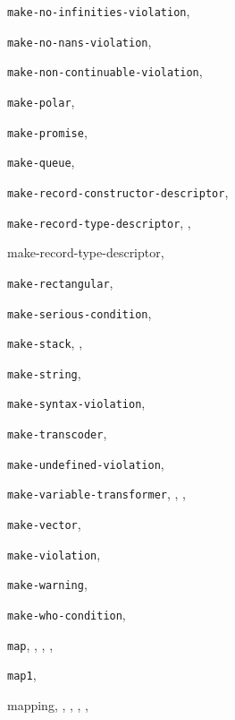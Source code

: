 {\begin{multicols}{2}
\texttt{make-no-infinities-violation}, \textit{\pageref{exceptions_s44}}
  
\texttt{make-no-nans-violation}, \textit{\pageref{exceptions_s45}}
  
\texttt{make-non-continuable-violation}, \textit{\pageref{exceptions_s27}}
  
\texttt{make-polar}, \textit{\pageref{objects_s123}}
  
\texttt{make-promise}, \pageref{control_s67}
  
\texttt{make-queue}, \pageref{start_s182}
  
\texttt{make-record-constructor-descriptor}, \textit{\pageref{records_s24}}
  
\texttt{make-record-type-descriptor}, \pageref{records_s2}, \textit{\pageref{records_s20}}
  
make-record-type-descriptor, \pageref{records_s19}
  
\texttt{make-rectangular}, \textit{\pageref{objects_s122}}
  
\texttt{make-serious-condition}, \textit{\pageref{exceptions_s19}}
  
\texttt{make-stack}, \pageref{start_s178}, \pageref{start_s190}
  
\texttt{make-string}, \textit{\pageref{objects_s218}}
  
\texttt{make-syntax-violation}, \textit{\pageref{exceptions_s30}}
  
\texttt{make-transcoder}, \textit{\pageref{io_s19}}
  
\texttt{make-undefined-violation}, \textit{\pageref{exceptions_s31}}
  
\texttt{make-variable-transformer}, \pageref{syntax_s10}, \pageref{syntax_s28}, \textit{\pageref{syntax_s42}}
  
\texttt{make-vector}, \textit{\pageref{objects_s232}}
  
\texttt{make-violation}, \textit{\pageref{exceptions_s20}}
  
\texttt{make-warning}, \textit{\pageref{exceptions_s23}}
  
\texttt{make-who-condition}, \textit{\pageref{exceptions_s26}}
  
\texttt{map}, \pageref{start_s147}, \pageref{start_s162}, \textit{\pageref{control_s30}}, \pageref{examples_s21}
  
\texttt{map1}, \pageref{start_s148}
  
mapping, \pageref{start_s146}, \pageref{control_s31}, \pageref{control_s34}, \pageref{control_s45}, \pageref{control_s48}
  

\end{multicols}}
